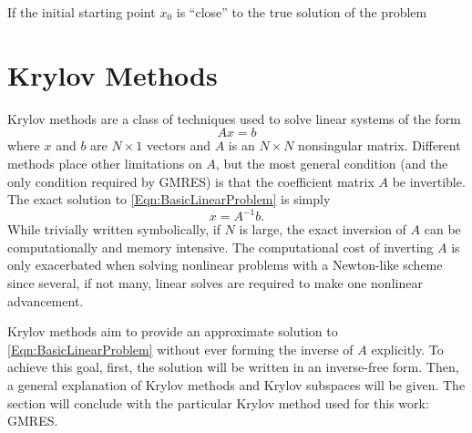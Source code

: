 \documentclass[Prelim,12pt]{WisconsinThesis}
\newcommand{\by}    {\!\times\!}
\begin{document}
If the initial starting point $x_0$ is ``close'' to the true solution of the problem





\section{Krylov Methods}
Krylov methods are a class of techniques used to solve linear systems of the form
\begin{equation}
    A x = b
    \label{Eqn:BasicLinearProblem}
\end{equation}
where $x$ and $b$ are $N \by 1$ vectors and $A$ is an $N \by N$ nonsingular matrix.
Different methods place other limitations on $A$, but the most general condition (and the only condition required by GMRES) is that the coefficient matrix $A$ be invertible.
The exact solution to \cref{Eqn:BasicLinearProblem} is simply
\begin{equation}
    x = A^{-1} b.
    \label{Eqn:BasicLinearSolution}
\end{equation}
While trivially written symbolically, if $N$ is large, the exact inversion of $A$ can be computationally and memory intensive.
The computational cost of inverting $A$ is only exacerbated when solving nonlinear problems with a Newton-like scheme since several, if not many, linear solves are required to make one nonlinear advancement.

Krylov methods aim to provide an approximate solution to \cref{Eqn:BasicLinearProblem} without ever forming the inverse of $A$ explicitly.
To achieve this goal, first, the solution will be written in an inverse-free form.
Then, a general explanation of Krylov methods and Krylov subspaces will be given.
The section will conclude with the particular Krylov method used for this work: GMRES.
\end{document}
